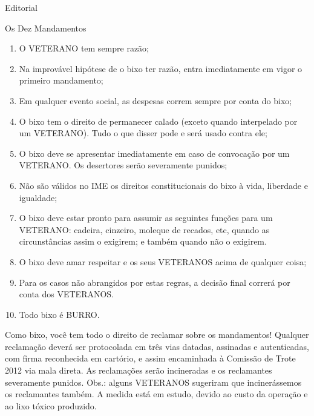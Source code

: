 \begin{secao}{Editorial}
\begin{subsecao}{Os Dez Mandamentos}
  \begin{enumerate}
  \item O VETERANO tem sempre razão;
  \item Na improvável hipótese de o bixo ter razão, entra imediatamente
        em vigor o primeiro mandamento;
  \item Em qualquer evento social, as despesas correm sempre por conta
        do bixo;
  \item O bixo tem o direito de permanecer calado (exceto quando interpelado
        por um VETERANO). Tudo o que disser pode e será usado contra ele;
  \item O bixo deve se apresentar imediatamente em caso de convocação por
        um VETERANO. Os desertores serão severamente punidos;
  \item Não são válidos no IME os direitos constitucionais do bixo à vida,
        liberdade e igualdade;
  \item O bixo deve estar pronto para assumir as seguintes funções para um
        VETERANO: cadeira, cinzeiro, moleque de recados, etc, quando as
        circunstâncias assim o exigirem; e também quando não o exigirem.
  \item O bixo deve amar respeitar e os seus VETERANOS acima de qualquer
        coisa;
  \item Para os casos não abrangidos por estas regras, a decisão final
        correrá por conta dos VETERANOS.
  \item Todo bixo é BURRO.
  \end{enumerate}

  
Como bixo, você tem todo o direito de reclamar sobre os mandamentos! Qualquer
reclamação deverá ser protocolada em três vias datadas, assinadas e autenticadas,
com firma reconhecida em cartório, e assim encaminhada à Comissão de Trote 2012
via mala direta. As reclamações serão incineradas e os reclamantes severamente
punidos. Obs.: alguns VETERANOS sugeriram que incinerássemos os reclamantes também.
A medida está em estudo, devido ao custo da operação e ao lixo tóxico produzido.


\end{subsecao}
\end{secao}
